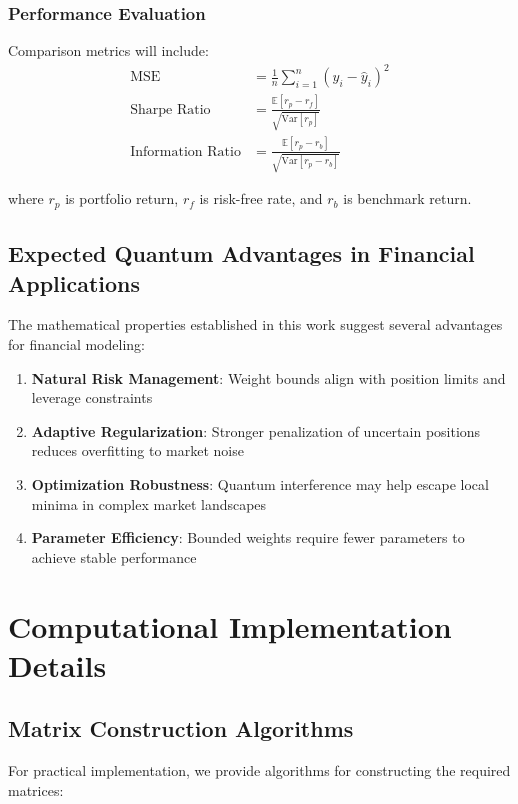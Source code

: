 \documentclass[11pt]{article}
\begin{document}
\subsubsection{Performance Evaluation}

Comparison metrics will include:
\begin{align}
\text{MSE} &= \frac{1}{n} \sum_{i=1}^n (y_i - \hat{y}_i)^2 \\
\text{Sharpe Ratio} &= \frac{\mathbb{E}[r_p - r_f]}{\sqrt{\text{Var}[r_p]}} \\
\text{Information Ratio} &= \frac{\mathbb{E}[r_p - r_b]}{\sqrt{\text{Var}[r_p - r_b]}}
\end{align}

where $r_p$ is portfolio return, $r_f$ is risk-free rate, and $r_b$ is benchmark return.

\subsection{Expected Quantum Advantages in Financial Applications}

The mathematical properties established in this work suggest several advantages for financial modeling:

\begin{enumerate}
\item \textbf{Natural Risk Management}: Weight bounds align with position limits and leverage constraints
\item \textbf{Adaptive Regularization}: Stronger penalization of uncertain positions reduces overfitting to market noise
\item \textbf{Optimization Robustness}: Quantum interference may help escape local minima in complex market landscapes
\item \textbf{Parameter Efficiency}: Bounded weights require fewer parameters to achieve stable performance
\end{enumerate}

\section{Computational Implementation Details}

\subsection{Matrix Construction Algorithms}

For practical implementation, we provide algorithms for constructing the required matrices:
\end{document}
